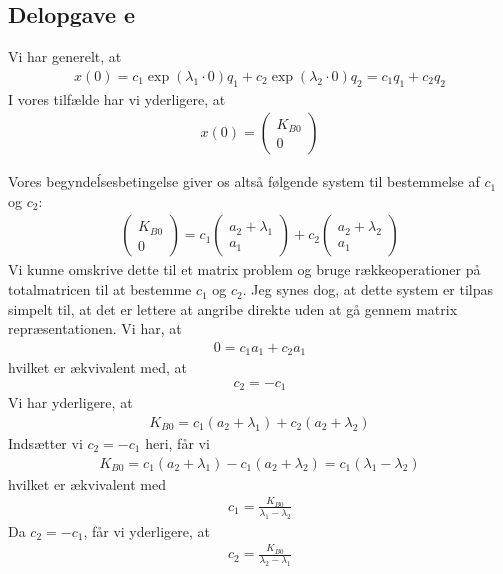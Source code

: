 \documentclass[12pt]{article}
\begin{document}
\subsection{Delopgave e}

Vi har generelt, at
\begin{align}
x(0) = c_1\exp(\lambda_1 \cdot0) q_1 + c_2\exp(\lambda_2\cdot 0)q_2 =  c_1q_1 + c_2q_2 
\end{align}
I vores tilfælde har vi yderligere, at
\begin{align}
x(0) = \begin{pmatrix}
K_{B0} \\ 0
\end{pmatrix}
\end{align}

Vores begyndeĺsesbetingelse giver os altså følgende system til bestemmelse af $c_1$ og $c_2$:
\begin{align}
\begin{pmatrix}
K_{B0} \\ 0
\end{pmatrix} =
c_1\begin{pmatrix}
a_2 + \lambda_1\\
a_1
\end{pmatrix}  + c_2\begin{pmatrix}
a_2 + \lambda_2\\
a_1
\end{pmatrix}
\end{align}
Vi kunne omskrive dette til et matrix problem og bruge rækkeoperationer på totalmatricen til at bestemme $c_1$ og $c_2$. Jeg synes dog, at dette system er tilpas simpelt til, at det er lettere at angribe direkte uden at gå gennem matrix repræsentationen. Vi har, at 
\begin{align}
0 = c_1a_1 + c_2a_1
\end{align}
hvilket er ækvivalent med, at 
\begin{align}
c_2 = -c_1
\end{align}
Vi har yderligere, at 
\begin{align}
K_{B0} = c_1(a_2 + \lambda_1) + c_2(a_2 + \lambda_2)
\end{align}
Indsætter vi $c_2 = -c_1$ heri, får vi
\begin{align}
K_{B0} = c_1(a_2 + \lambda_1) - c_1(a_2 + \lambda_2) = c_1(\lambda_1 - \lambda_2)
\end{align}
hvilket er ækvivalent med
\begin{align}
c_1 =  \frac{K_{B0}}{\lambda_1 - \lambda_2}
\end{align}
Da $c_2 = -c_1$, får vi yderligere, at 
\begin{align}
c_2 =  \frac{K_{B0}}{\lambda_2 - \lambda_1}
\end{align}
\end{document}
